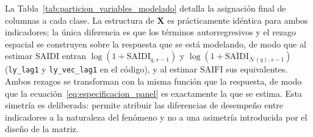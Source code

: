 La Tabla~\ref{tab:particion_variables_modelado} detalla la asignación final de columnas a cada clase. La estructura de $\mathbf{X}$ es prácticamente idéntica para ambos indicadores; la única diferencia es que los términos autorregresivos y el rezago espacial se construyen sobre la respuesta que se está modelando, de modo que al estimar $\mathrm{SAIDI}$ entran $\log(1+\mathrm{SAIDI}_{q,s-1})$ y $\log(1+\overline{\mathrm{SAIDI}}_{\mathcal{N}(q),s-1})$ (\texttt{ly\_lag1} y \texttt{ly\_vec\_lag1} en el código), y al estimar $\mathrm{SAIFI}$ sus equivalentes. Ambos rezagos se transforman con la misma función que la respuesta, de modo que la ecuación~\eqref{eq:especificacion_panel} es exactamente la que se estima. Esta simetría es deliberada: permite atribuir las diferencias de desempeño entre indicadores a la naturaleza del fenómeno y no a una asimetría introducida por el diseño de la matriz.

